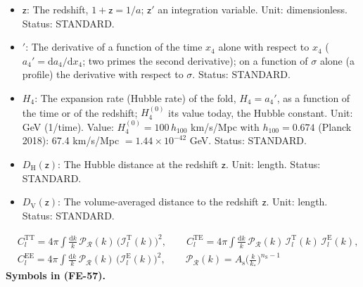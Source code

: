 \documentclass[
  10pt,
]{article}
\begin{document}
\begin{itemize}
  for a spatially flat fold. Unit: length. Status: STANDARD.
\item
  \(\mathsf{z}\): The redshift, \(1 + \mathsf{z} = 1/a\);
  \(\mathsf{z}'\) an integration variable. Unit: dimensionless. Status:
  STANDARD.
\item
  \({}'\): The derivative of a function of the time \(x_4\) alone with
  respect to \(x_4\) (\(a_4' = \mathrm{d}a_4/\mathrm{d}x_4\); two primes
  the second derivative); on a function of \(\sigma\) alone (a profile)
  the derivative with respect to \(\sigma\). Status: STANDARD.
\item
  \(H_4\): The expansion rate (Hubble rate) of the fold, \(H_4 = a_4'\),
  as a function of the time or of the redshift; \(H_4^{(0)}\) its value
  today, the Hubble constant. Unit: GeV (1/time). Value:
  \(H_4^{(0)} = 100\,h_{100}\) km/s/Mpc with \(h_{100} = 0.674\) (Planck
  2018): 67.4 km/s/Mpc \(= 1.44\times10^{-42}\) GeV. Status: STANDARD.
\item
  \(D_{\mathrm{H}}(\mathsf{z})\): The Hubble distance at the redshift
  \(\mathsf{z}\). Unit: length. Status: STANDARD.
\item
  \(D_{\mathrm{V}}(\mathsf{z})\): The volume-averaged distance to the
  redshift \(\mathsf{z}\). Unit: length. Status: STANDARD.
\end{itemize}

\[
\begin{aligned}
&C_l^{\mathrm{TT}} = 4\pi\int\frac{\mathrm{d}k}{k}\,\mathcal{P}_{\mathcal{R}}(k)\,\big(\mathcal{I}_l^{\mathrm{T}}(k)\big)^2,\qquad
 C_l^{\mathrm{TE}} = 4\pi\int\frac{\mathrm{d}k}{k}\,\mathcal{P}_{\mathcal{R}}(k)\,\mathcal{I}_l^{\mathrm{T}}(k)\,\mathcal{I}_l^{\mathrm{E}}(k),\\
&C_l^{\mathrm{EE}} = 4\pi\int\frac{\mathrm{d}k}{k}\,\mathcal{P}_{\mathcal{R}}(k)\,\big(\mathcal{I}_l^{\mathrm{E}}(k)\big)^2,\qquad
 \mathcal{P}_{\mathcal{R}}(k) = A_{\mathrm{s}}\Big(\frac{k}{k_*}\Big)^{n_{\mathrm{S}} - 1}
\end{aligned} \tag{FE-57}
\] \textbf{Symbols in (FE-57).}
\end{document}

